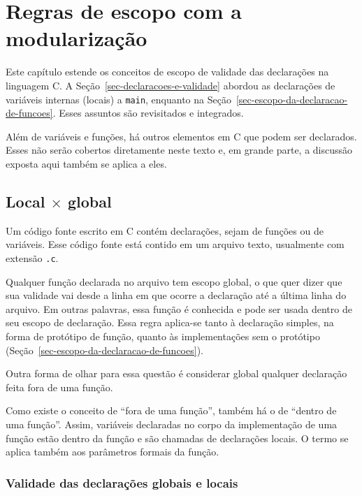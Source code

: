 \documentclass[
  11pt,
  a4paper,
]{scrbook}
\begin{document}
\chapter{Regras de escopo com a
modularização}\label{sec-regras-de-escopo-com-modularizacao}

Este capítulo estende os conceitos de escopo de validade das declarações
na linguagem C. A Seção~\ref{sec-declaracoes-e-validade} abordou as
declarações de variáveis internas (locais) a \texttt{main}, enquanto na
Seção~\ref{sec-escopo-da-declaracao-de-funcoes}. Esses assuntos são
revisitados e integrados.

Além de variáveis e funções, há outros elementos em C que podem ser
declarados. Esses não serão cobertos diretamente neste texto e, em
grande parte, a discussão exposta aqui também se aplica a eles.

\section{\texorpdfstring{Local \(\times\)
global}{Local \textbackslash times global}}\label{local-times-global}

Um código fonte escrito em C contém declarações, sejam de funções ou de
variáveis. Esse código fonte está contido em um arquivo texto,
usualmente com extensão \texttt{.c}.

Qualquer função declarada no arquivo tem escopo global, o que quer dizer
que sua validade vai desde a linha em que ocorre a declaração até a
última linha do arquivo. Em outras palavras, essa função é conhecida e
pode ser usada dentro de seu escopo de declaração. Essa regra aplica-se
tanto à declaração simples, na forma de protótipo de função, quanto às
implementações sem o protótipo
(Seção~\ref{sec-escopo-da-declaracao-de-funcoes}).

Outra forma de olhar para essa questão é considerar global qualquer
declaração feita fora de uma função.

Como existe o conceito de ``fora de uma função'', também há o de
``dentro de uma função''. Assim, variáveis declaradas no corpo da
implementação de uma função estão dentro da função e são chamadas de
declarações locais. O termo se aplica também aos parâmetros formais da
função.

\subsection{Validade das declarações globais e
locais}\label{validade-das-declarauxe7uxf5es-globais-e-locais}
\end{document}
